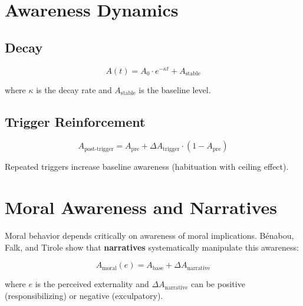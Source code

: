 \section{Awareness Dynamics}
\label{sec:aware-dynamics}

\subsection{Decay}

\begin{equation}
A(t) = A_0 \cdot e^{-\kappa t} + A_{\text{stable}}
\end{equation}

where $\kappa$ is the decay rate and $A_{\text{stable}}$ is the baseline level.

\subsection{Trigger Reinforcement}

\begin{equation}
A_{\text{post-trigger}} = A_{\text{pre}} + \Delta A_{\text{trigger}} \cdot (1 - A_{\text{pre}})
\end{equation}

Repeated triggers increase baseline awareness (habituation with ceiling effect).

\section{Moral Awareness and Narratives}
\label{sec:aware-moral-narratives}

\begin{tcolorbox}[colback=orange!5!white, colframe=orange!75!black,
    title=Moral Awareness: How Narratives Shape Perception of Consequences]

Moral behavior depends critically on awareness of moral implications. Bénabou, Falk, and Tirole \citep{benabou2018narratives} show that \textbf{narratives} systematically manipulate this awareness:

\begin{equation}
A_{\text{moral}}(e) = A_{\text{base}} + \Delta A_{\text{narrative}}
\label{eq:moral-awareness}
\end{equation}

where $e$ is the perceived externality and $\Delta A_{\text{narrative}}$ can be positive (responsibilizing) or negative (exculpatory).

\end{tcolorbox}

